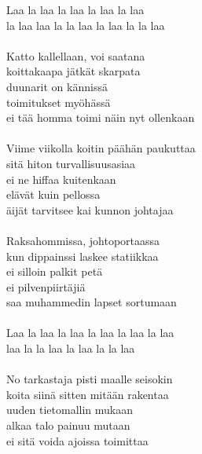 
            Laa la laa la laa la laa la laa \\
            la laa laa la la laa la laa la la laa \\
\hspace{10mm} \\
            Katto kallellaan, voi saatana \\
            koittakaapa jätkät skarpata \\
            duunarit on kännissä \\
            toimitukset myöhässä \\
            ei tää homma toimi näin nyt ollenkaan \\
\hspace{10mm} \\
            Viime viikolla koitin päähän paukuttaa \\
            sitä hiton turvallisuusasiaa \\
            ei ne hiffaa kuitenkaan \\
            elävät kuin pellossa \\
            äijät tarvitsee kai kunnon johtajaa \\
\hspace{10mm} \\
            Raksahommissa, johtoportaassa \\
            kun dippainssi laskee statiikkaa \\
            ei silloin palkit petä \\
            ei pilvenpiirtäjiä \\
            saa muhammedin lapset sortumaan \\
\hspace{10mm} \\
            Laa la laa la laa la laa la laa la laa \\
            laa la la laa la laa la la laa \\
\hspace{10mm} \\
            No tarkastaja pisti maalle seisokin \\
            koita siinä sitten mitään rakentaa \\
            uuden tietomallin mukaan \\
            alkaa talo painuu mutaan \\
            ei sitä voida ajoissa toimittaa \\
